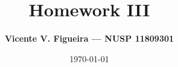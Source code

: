 \documentclass[a4paper, 12pt]{article}
\title{\textbf{Homework III}}
\author{\textbf{Vicente V. Figueira --- NUSP 11809301}}
\date{\today}
\theoremstyle{dotless}
\numberwithin{equation}{section}
\theoremstyle{dotless}
\renewcommand{\thesubsection}{\thesection.\Alph{subsection})}
\begin{document}
\maketitle

\tableofcontents



\newpage



\newpage



\newpage

\renewcommand{\thesubsection}{\thesection.\arabic{subsection}}

\appendix



\newpage


\end{document}
